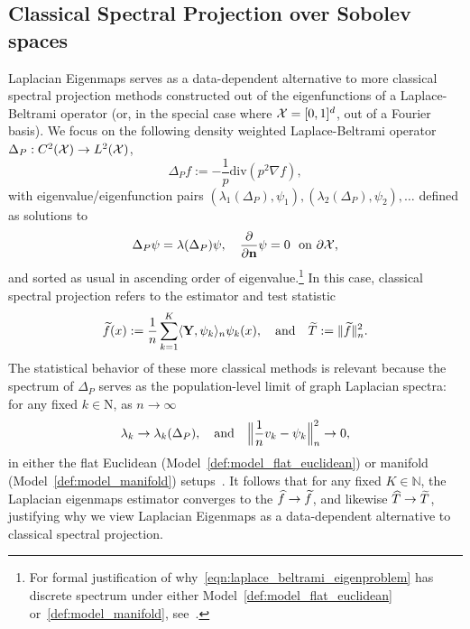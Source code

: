 \subsection{Classical Spectral Projection over Sobolev spaces}
\label{subsec:spectral_projection}
Laplacian Eigenmaps serves as a data-dependent alternative to more classical spectral projection methods constructed out of the eigenfunctions of a Laplace-Beltrami operator (or, in the special case where $\mathcal{X} = [0,1]^d$, out of a Fourier basis).
We focus on the following density weighted Laplace-Beltrami operator $\Delta_P:C^2(\mathcal{X}) \to L^2(\mathcal{X})$,
\begin{equation}
\label{eqn:laplace_beltrami}
\Delta_Pf := -\frac{1}{p} \mathrm{div}(p^2\nabla f),
\end{equation}
with eigenvalue/eigenfunction pairs $(\lambda_1(\Delta_P),\psi_1),(\lambda_2(\Delta_P),\psi_2),\ldots$ defined as solutions to
\begin{equation}
\label{eqn:laplace_beltrami_eigenproblem}
\Delta_P\psi = \lambda(\Delta_P) \psi, \quad \frac{\partial}{\partial{\bf n}}\psi = 0~~\textrm{on $\partial \mathcal{X}$,}
\end{equation}
and sorted as usual in ascending order of eigenvalue.\footnote{For formal justification of why~\eqref{eqn:laplace_beltrami_eigenproblem} has discrete spectrum under either Model~\ref{def:model_flat_euclidean} or~\ref{def:model_manifold}, see~\cite{garciatrillos18,trillos2019}.} In this case, classical spectral projection refers to the estimator and test statistic
\begin{equation}
\label{eqn:classical_spectral_projection}
\widetilde{f}(x) := \frac{1}{n}\sum_{k = 1}^{K} \langle {\bf Y}, \psi_k \rangle_{n} \psi_k(x),\quad\textrm{and}\quad \widetilde{T} := \|\widetilde{f}\|_n^2.
\end{equation}
The statistical behavior of these more classical methods is relevant because the spectrum of $\Delta_P$ serves as the population-level limit of graph Laplacian spectra: for any fixed $k \in \mathrm{N}$, as $n \to \infty$
\begin{equation}
\lambda_k \to \lambda_k(\Delta_P), \quad\textrm{and}\quad \Bigl\|\frac{1}{n}v_k - \psi_k\Bigr\|_n^2 \to 0,
\end{equation}
in either the flat Euclidean (Model~\ref{def:model_flat_euclidean}) or manifold (Model~\ref{def:model_manifold}) setups~\citep{garciatrillos18,trillos2019}. It follows that for any fixed $K \in \mathbb{N}$, the Laplacian eigenmaps estimator converges to the $\widehat{f} \to \widetilde{f}$, and likewise $\widehat{T} \to \widetilde{T}$, justifying why we view Laplacian Eigenmaps as a data-dependent alternative to classical spectral projection.
 
